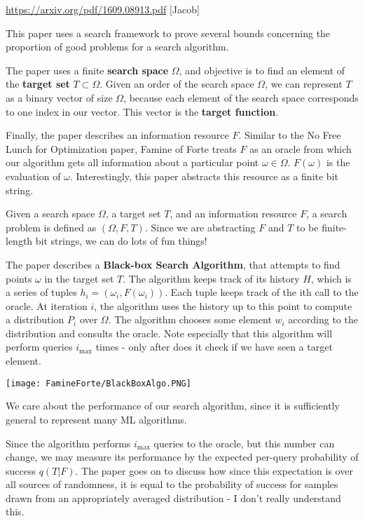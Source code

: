 \documentclass[12pt]{article}
\begin{document}
\url{https://arxiv.org/pdf/1609.08913.pdf} [Jacob]

This paper uses a search framework to prove several bounds concerning the proportion of good problems for a search algorithm. 

The paper uses a finite \textbf{search space} $\Omega$, and objective is to find an element of the \textbf{target set} $T \subset \Omega$. Given an order of the search space $\Omega$, we can represent $T$ as a binary vector of size $\Omega$, because each element of the search space corresponds to one index in our vector. This vector is the \textbf{target function}. 

Finally, the paper describes an information resource $F$. Similar to the No Free Lunch for Optimization paper, Famine of Forte treats $F$ as an oracle from which our algorithm gets all information about a particular point $\omega \in \Omega$. $F(\omega)$ is the evaluation of $\omega$. Interestingly, this paper abstracts this resource as a finite bit string. 

Given a search space $\Omega$, a target set $T$, and an information resource $F$, a search problem is defined as $(\Omega, F, T)$. Since we are abstracting $F$ and $T$ to be finite-length bit strings, we can do lots of fun things!

The paper describes a \textbf{Black-box Search Algorithm}, that attempts to find points $\omega$ in the target set $T$. The algorithm keeps track of its history $H$, which is a series of tuples $h_i = (\omega_i, F(\omega_i))$. Each tuple keeps track of the ith call to the oracle. At iteration $i$, the algorithm uses the history up to this point to compute a distribution $P_i$ over $\Omega$. The algorithm chooses some element $w_i$ according to the distribution and consults the oracle. Note especially that this algorithm will perform queries $i_{\text{max}}$ times - only after does it check if we have seen a target element.

\begin{center}
    \texttt{[image: FamineForte/BlackBoxAlgo.PNG]}
\end{center}

We care about the performance of our search algorithm, since it is sufficiently general to represent many ML algorithms. 

Since the algorithm performs $i_{\text{max}}$ queries to the oracle, but this number can change, we may measure its performance by the expected per-query probability of success $q(T|F)$. The paper goes on to discuss how since this expectation is over all sources of randomness, it is equal to the probability of success for samples drawn from an appropriately averaged distribution - I don't really understand this. 
\end{document}
